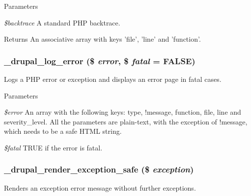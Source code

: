 \begin{DoxyParams}{Parameters}
\item[{\em \$backtrace}]A standard PHP backtrace.\end{DoxyParams}
\begin{DoxyReturn}{Returns}
An associative array with keys 'file', 'line' and 'function'. 
\end{DoxyReturn}
\hypertarget{errors_8inc_adae530f2d49e1067ab4e9dd5753e387a}{
\subsubsection[{\_\-drupal\_\-log\_\-error}]{\setlength{\rightskip}{0pt plus 5cm}\_\-drupal\_\-log\_\-error (\$ {\em error}, \/  \$ {\em fatal} = {\ttfamily FALSE})}}
\label{errors_8inc_adae530f2d49e1067ab4e9dd5753e387a}
Logs a PHP error or exception and displays an error page in fatal cases.


\begin{DoxyParams}{Parameters}
\item[{\em \$error}]An array with the following keys: type, !message, function, file, line and severity\_\-level. All the parameters are plain-\/text, with the exception of !message, which needs to be a safe HTML string. \item[{\em \$fatal}]TRUE if the error is fatal. \end{DoxyParams}
\hypertarget{errors_8inc_a1f8bd68a322e820f9bed014cb6a9f1de}{
\subsubsection[{\_\-drupal\_\-render\_\-exception\_\-safe}]{\setlength{\rightskip}{0pt plus 5cm}\_\-drupal\_\-render\_\-exception\_\-safe (\$ {\em exception})}}
\label{errors_8inc_a1f8bd68a322e820f9bed014cb6a9f1de}
Renders an exception error message without further exceptions.


